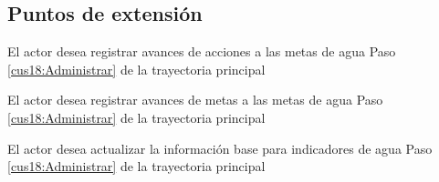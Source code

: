 \subsection{Puntos de extensión}

\UCExtensionPoint
{El actor desea registrar avances de acciones a las metas de agua}
{ Paso \ref{cus18:Administrar} de la trayectoria principal}
{}

\UCExtensionPoint
{El actor desea registrar avances de metas a las metas de agua}
{ Paso \ref{cus18:Administrar} de la trayectoria principal}
{}

\UCExtensionPoint
{El actor desea actualizar la información base para indicadores de agua}
{ Paso \ref{cus18:Administrar} de la trayectoria principal}
{}